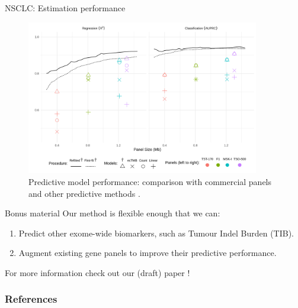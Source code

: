 \documentclass{beamer}
\begin{document}
\begin{frame}{NSCLC: Estimation performance}

\begin{figure}[htbp]
\centering
\includegraphics[width=4in]{fig7.png}
\caption{Predictive model performance: comparison with commercial panels and other predictive methods \citep{bradley_data-driven_2021, yao_ectmb_2020}. \label{fig:7}}
\end{figure}
\end{frame}

\begin{frame}{Bonus material}
Our method is flexible enough that we can:
\begin{enumerate}
    \item Predict other exome-wide biomarkers, such as Tumour Indel Burden (TIB).
    \item Augment existing gene panels to improve their predictive performance.
\end{enumerate}
For more information check out our (draft) paper \cite{bradley_data-driven_2021}!
\end{frame}


\begin{frame}[allowframebreaks]
        \frametitle{References}
        
\end{frame}
\end{document}
